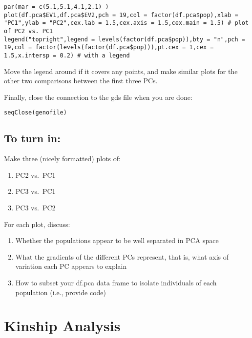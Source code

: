 \documentclass[
]{book}
\providecommand{\tightlist}{%
  \setlength{\itemsep}{0pt}\setlength{\parskip}{0pt}}
\begin{document}
\begin{verbatim}
par(mar = c(5.1,5.1,4.1,2.1) ) 
plot(df.pca$EV1,df.pca$EV2,pch = 19,col = factor(df.pca$pop),xlab = "PC1",ylab = "PC2",cex.lab = 1.5,cex.axis = 1.5,cex.main = 1.5) # plot of PC2 vs. PC1
legend("topright",legend = levels(factor(df.pca$pop)),bty = "n",pch = 19,col = factor(levels(factor(df.pca$pop))),pt.cex = 1,cex = 1.5,x.intersp = 0.2) # with a legend
\end{verbatim}

Move the legend around if it covers any points, and make similar plots for the other two comparisons between the first three PCs.

Finally, close the connection to the gds file when you are done:

\begin{verbatim}
seqClose(genofile)
\end{verbatim}

\hypertarget{to-turn-in}{%
\section{To turn in:}\label{to-turn-in}}

Make three (nicely formatted) plots of:

\begin{enumerate}
\def\labelenumi{\arabic{enumi}.}
\tightlist
\item
  PC2 vs.~PC1
\item
  PC3 vs.~PC1
\item
  PC3 vs.~PC2
\end{enumerate}

For each plot, discuss:

\begin{enumerate}
\def\labelenumi{\arabic{enumi}.}
\tightlist
\item
  Whether the populations appear to be well separated in PCA space
\item
  What the gradients of the different PCs represent, that is, what axis of variation each PC appears to explain
\item
  How to subset your df.pca data frame to isolate individuals of each population (i.e., provide code)
\end{enumerate}

\hypertarget{kinship-analysis}{%
\chapter{Kinship Analysis}\label{kinship-analysis}}
\end{document}
